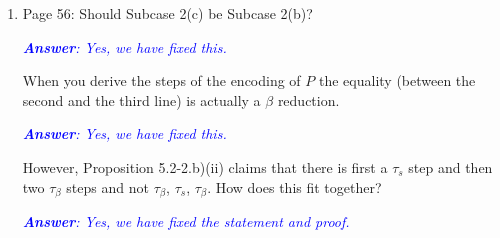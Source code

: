\documentclass[11pt,a4paper]{article}
\newcommand{\answ}[1]{\smallskip \emph{\textcolor{blue}{\textbf{Answer}:  #1}}}
\begin{document}
\begin{enumerate}
  Why do you use commata (,) instead of $\cdot$ to combine elements of type
  environments in the Cases 3 and 4?
  
  \answ{We have fixed this.}
  
  Is $S^* = \tilde{T}$ in Case 3? If not, how do you derive (C.5)?
  
  \answ{We have clarified what $S^*$ is - please see the revised proof.}
  
  In the derivation below (C.6) $z$ should be $y$ and $\Delta_{\tilde{n}}$ needs to be
  empty in order to match to the proof goal of this case.
  
  \answ{We have corrected the $y$ and the proof goal ($\Delta$ appears in the typing of the recursive variable).}
  
  In Case 4 do you assume that $\Delta = \Delta_{\tilde{n}}$?
  
  \answ{Yes, we have removed this confusing notation.}
  
  What is the $||ofn(P)||$ in Case 4?

  \answ{We have removed this confusing notation.}
  
  I did not check the other proofs of type preservation/soundness but expect
  similar questions.
  
  \answ{We have checked again the other proofs.}
  
\item Page 56: Should Subcase 2(c) be Subcase 2(b)? 

\answ{Yes, we have fixed this.}

When you derive the steps of the
  encoding of $P$ the equality (between the second and the third line) is actually
  a $\beta$ reduction. 
  
  \answ{Yes, we have fixed this.}
  
  However, Proposition 5.2-2.b)(ii) claims that there is
  first a $\tau_s$ step and then two $\tau_\beta$ steps and not $\tau_\beta$, $\tau_s$,
  $\tau_\beta$. How does this fit together?
  
  \answ{Yes, we have fixed the statement and proof.}
  
\end{enumerate}
\end{document}
